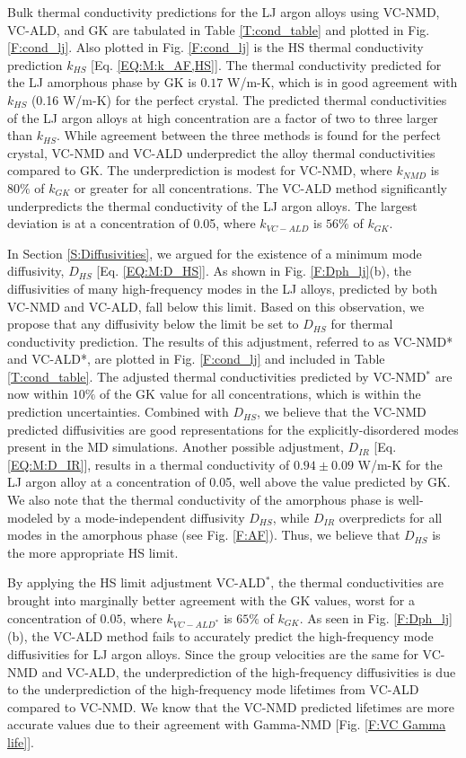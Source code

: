 \documentclass[12pt,twocolumn,iop]{/usr/share/texmf-texlive/tex/latex/iop/iopart}[/usr/share/texmf-texlive/tex/latex/iop/]
\begin{document}
Bulk thermal conductivity predictions for the LJ argon alloys using  
VC-NMD, VC-ALD, and GK are tabulated in Table \ref{T:cond_table} 
and plotted in Fig. \ref{F:cond_lj}. Also plotted 
in Fig. \ref{F:cond_lj} is the HS  
thermal conductivity prediction $k_{HS}$ 
[Eq. \eqref{EQ:M:k_AF,HS}]. The thermal conductivity predicted 
for the LJ amorphous phase by GK is $0.17$ W/m-K,  
which is in good agreement with $k_{HS}$ (0.16 W/m-K) for the 
perfect crystal.  
The predicted thermal conductivities of the LJ argon alloys at high 
concentration are a factor of two to three larger than $k_{HS}$.  
While agreement between the three methods is found for the perfect 
crystal, VC-NMD and VC-ALD underpredict the alloy thermal 
conductivities compared to GK. 
The underprediction is modest for VC-NMD, where $k_{NMD}$ is 
$80\%$ of $k_{GK}$ or greater for all concentrations. The VC-ALD method 
significantly underpredicts the thermal conductivity of the LJ argon alloys. 
The largest deviation is at a concentration of 0.05, where 
$k_{VC-ALD}$ is $56\%$ of $k_{GK}$.

In Section \ref{S:Diffusivities}, 
we argued for the existence of a minimum mode 
diffusivity, $D_{HS}$ [Eq. \eqref{EQ:M:D_HS}]. 
As shown in Fig. \ref{F:Dph_lj}(b), the diffusivities of 
many high-frequency modes in the LJ alloys, predicted by both VC-NMD 
and VC-ALD, fall below this limit.  Based on this observation, we propose 
that any diffusivity below the limit be set to $D_{HS}$ 
for thermal conductivity prediction. 
The results of this adjustment, 
referred to as VC-NMD* and VC-ALD*, are plotted in Fig. \ref{F:cond_lj} 
and included in Table \ref{T:cond_table}.  
The adjusted thermal conductivities predicted by VC-NMD$^*$ are now  
within $10\%$ of the GK value for all concentrations, which
is within the prediction uncertainties. 
Combined with $D_{HS}$, we believe that the VC-NMD predicted 
diffusivities are good representations for the explicitly-disordered 
modes present in the MD simulations. Another possible 
adjustment, $D_{IR}$ [Eq. \eqref{EQ:M:D_IR}], results in a thermal 
conductivity of $0.94 \pm 0.09$ W/m-K for the LJ argon alloy at a 
concentration of 0.05, well above the value predicted by GK. 
We also note that the thermal 
conductivity of the amorphous phase is well-modeled by a mode-independent 
diffusivity $D_{HS}$, while $D_{IR}$ overpredicts for all modes in the 
amorphous phase (see Fig. \ref{F:AF}). 
Thus, we believe that $D_{HS}$ is the more appropriate HS limit. 

By applying the HS limit adjustment VC-ALD$^*$, the thermal 
conductivities are brought into marginally better agreement with 
the GK values, worst for a concentration of $0.05$, where 
$k_{VC-ALD^*}$ is $65\%$ of $ k_{GK}$.  
As seen in Fig. \ref{F:Dph_lj}(b), the VC-ALD method fails to 
accurately predict the high-frequency mode diffusivities for 
LJ argon alloys. Since the group velocities are the same for 
VC-NMD and VC-ALD, the underprediction of the high-frequency 
diffusivities is
due to the underprediction of the high-frequency 
mode lifetimes from VC-ALD compared to VC-NMD. We know that the 
VC-NMD predicted lifetimes are more accurate values due 
to their agreement with Gamma-NMD [Fig. \ref{F:VC Gamma life}]. 
\end{document}
